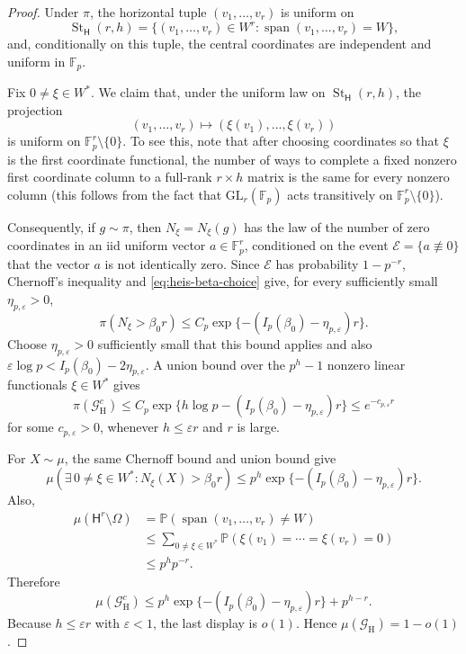 \documentclass[11pt, reqno]{amsart}
\numberwithin{equation}{section}
\newcommand{\Fp}{\mathbb F_p}
\newcommand{\Heis}{\mathsf H}
\newcommand{\Span}{\operatorname{span}}
\newcommand{\Prob}{\mathbb P}
\newcommand{\Good}{\mathcal G}
\begin{document}
\begin{proof}
Under \(\pi\), the horizontal tuple \((v_1,\ldots,v_r)\) is uniform on
\[
    \operatorname{St}_{\Heis}(r,h)=\{(v_1,\ldots,v_r)\in W^r:\Span(v_1,\ldots,v_r)=W\},
\]
and, conditionally on this tuple, the central coordinates are independent and
uniform in \(\Fp\).

Fix \(0\ne\xi\in W^*\).  We claim that, under the uniform law on \(\operatorname{St}_{\Heis}(r,h)\),
the projection
\[
    (v_1,\ldots,v_r)\mapsto(\xi(v_1),\ldots,\xi(v_r))
\]
is uniform on \(\Fp^r\setminus\{0\}\).  To see this, note that after choosing coordinates so that
\(\xi\) is the first coordinate functional, the number of ways to complete a
fixed nonzero first coordinate column to a full-rank \(r\times h\) matrix is the
same for every nonzero column (this follows from the fact that \(\mathrm{GL}_r(\Fp)\) acts transitively on \(\Fp^r\setminus\{0\}\)).

Consequently, if $g \sim \pi$, then  \(N_\xi = N_{\xi}(g)\) has the law of the number of zero coordinates in an iid
uniform vector \(a \in \Fp^r\), conditioned on the event $\mathcal{E} = \{a \not\equiv 0\}$ that the vector $a$ is not identically
zero.  Since $\mathcal{E}$  has probability \(1-p^{-r}\), Chernoff's inequality and \eqref{eq:heis-beta-choice} give, for every sufficiently small
\(\eta_{p,\varepsilon}>0\),
\[
    \pi(N_\xi>\beta_0 r)
    \le C_p\exp\{-(I_p(\beta_0)-\eta_{p,\varepsilon})r\}.
\]
Choose \(\eta_{p,\varepsilon} > 0\) sufficiently small that this bound applies and also 
\(\varepsilon\log p<I_p(\beta_0)-2\eta_{p,\varepsilon}\).  A union bound over the
\(p^h-1\) nonzero linear functionals $\xi \in W^{\ast}$ gives
\[
    \pi(\Good_{\mathrm H}^c)
    \le C_p\exp\{h\log p-(I_p(\beta_0)-\eta_{p,\varepsilon})r\}
    \le e^{-c_{p,\varepsilon}r}
\]
for some \(c_{p,\varepsilon}>0\), whenever \(h\le\varepsilon r\) and \(r\) is
large.

For \(X\sim\mu\), the same Chernoff bound and union bound give
\[
    \mu\left(\exists\,0\ne\xi\in W^*:N_\xi(X)>\beta_0 r\right)
    \le p^h\exp\{-(I_p(\beta_0)-\eta_{p,\varepsilon})r\}.
\]
Also,
\[
\begin{aligned}
    \mu(\Heis^r\setminus\Omega)
    &=\Prob(\Span(v_1,\ldots,v_r)\ne W)\\
    &\le \sum_{0\ne\xi\in W^*}\Prob(\xi(v_1)=\cdots=\xi(v_r)=0)\\
    &\le p^h p^{-r}.
\end{aligned}
\]
Therefore
\[
    \mu(\Good_{\mathrm H}^c)
    \le p^h\exp\{-(I_p(\beta_0)-\eta_{p,\varepsilon})r\}+p^{h-r}.
\]
Because \(h\le\varepsilon r\) with \(\varepsilon<1\), the last display is
\(o(1)\). Hence \(\mu(\Good_{\mathrm H})=1-o(1)\).
\end{proof}
\end{document}

